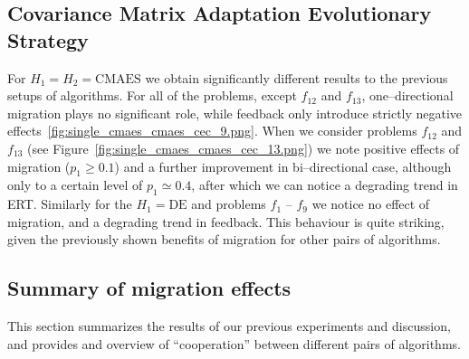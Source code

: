 \documentclass{sig-alternate}
\begin{document}
\subsection{Covariance Matrix Adaptation Evolutionary Strategy}

For $H_1 = H_2 = \mbox{CMAES}$ we obtain significantly different results to the previous setups of algorithms.
For all of the problems, except $f_{12}$ and $f_{13}$, one--directional migration plays no significant role, while feedback only introduce strictly negative effects~\ref{fig:single_cmaes_cmaes_cec_9.png}.
When we consider problems $f_{12}$ and $f_{13}$ (see Figure~\ref{fig:single_cmaes_cmaes_cec_13.png}) we note positive effects of migration ($p_1 \geq 0.1$) and a further improvement in bi--directional case, although only to a certain level of $p_1 \simeq 0.4$, after which we can notice a degrading trend in ERT.
Similarly for the $H_1 = \mbox{DE}$ and problems $f_1$ -- $f_9$ we notice no effect of migration, and a degrading trend in feedback.
This behaviour is quite striking, given the previously shown benefits of migration for other pairs of algorithms.

\subsection{Summary of migration effects}

This section summarizes the results of our previous experiments and discussion, and provides and overview of ``cooperation'' between different pairs of algorithms.





\end{document}
